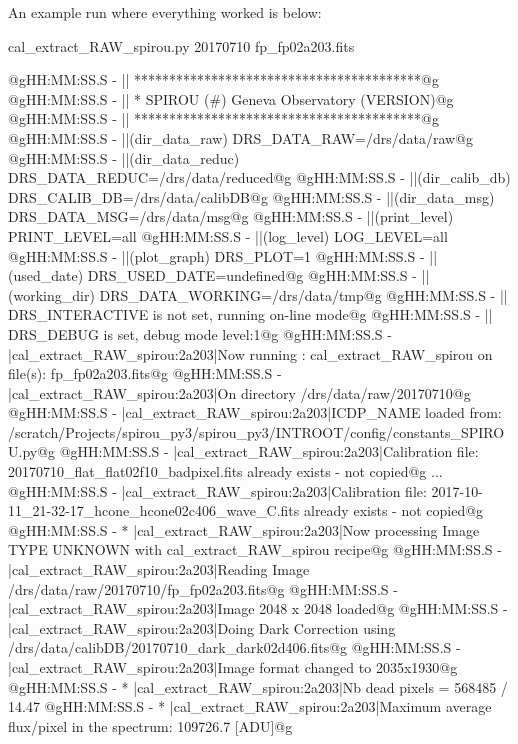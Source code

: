 An example run where everything worked is below:
\begin{cmdbox}[title={example}]
cal_extract_RAW_spirou.py 20170710 fp_fp02a203.fits
\end{cmdbox}
\begin{cmdboxprintspecial}[fontupper=\tiny, fontlower=\tiny]
@gHH:MM:SS.S -   || *****************************************@g
@gHH:MM:SS.S -   || * SPIROU \@(#) Geneva Observatory (VERSION)@g
@gHH:MM:SS.S -   || *****************************************@g
@gHH:MM:SS.S -   ||(dir_data_raw)      DRS_DATA_RAW=/drs/data/raw@g
@gHH:MM:SS.S -   ||(dir_data_reduc)    DRS_DATA_REDUC=/drs/data/reduced@g
@gHH:MM:SS.S -   ||(dir_calib_db)      DRS_CALIB_DB=/drs/data/calibDB@g
@gHH:MM:SS.S -   ||(dir_data_msg)      DRS_DATA_MSG=/drs/data/msg@g
@gHH:MM:SS.S -   ||(print_level)       PRINT_LEVEL=all         %
@gHH:MM:SS.S -   ||(log_level)         LOG_LEVEL=all         %
@gHH:MM:SS.S -   ||(plot_graph)        DRS_PLOT=1            %
@gHH:MM:SS.S -   ||(used_date)         DRS_USED_DATE=undefined@g
@gHH:MM:SS.S -   ||(working_dir)       DRS_DATA_WORKING=/drs/data/tmp@g
@gHH:MM:SS.S -   ||                    DRS_INTERACTIVE is not set, running on-line mode@g
@gHH:MM:SS.S -   ||                    DRS_DEBUG is set, debug mode level:1@g
@gHH:MM:SS.S -   |cal_extract_RAW_spirou:2a203|Now running : cal_extract_RAW_spirou on file(s): fp_fp02a203.fits@g
@gHH:MM:SS.S -   |cal_extract_RAW_spirou:2a203|On directory /drs/data/raw/20170710@g
@gHH:MM:SS.S -   |cal_extract_RAW_spirou:2a203|ICDP_NAME loaded from: /scratch/Projects/spirou_py3/spirou_py3/INTROOT/config/constants_SPIROU.py@g
@gHH:MM:SS.S -   |cal_extract_RAW_spirou:2a203|Calibration file: 20170710_flat_flat02f10_badpixel.fits already exists - not copied@g
...
@gHH:MM:SS.S -   |cal_extract_RAW_spirou:2a203|Calibration file: 2017-10-11_21-32-17_hcone_hcone02c406_wave_C.fits already exists - not copied@g
@gHH:MM:SS.S - * |cal_extract_RAW_spirou:2a203|Now processing Image TYPE UNKNOWN with cal_extract_RAW_spirou recipe@g
@gHH:MM:SS.S -   |cal_extract_RAW_spirou:2a203|Reading Image /drs/data/raw/20170710/fp_fp02a203.fits@g
@gHH:MM:SS.S -   |cal_extract_RAW_spirou:2a203|Image 2048 x 2048 loaded@g
@gHH:MM:SS.S -   |cal_extract_RAW_spirou:2a203|Doing Dark Correction using /drs/data/calibDB/20170710_dark_dark02d406.fits@g
@gHH:MM:SS.S -   |cal_extract_RAW_spirou:2a203|Image format changed to 2035x1930@g
@gHH:MM:SS.S - * |cal_extract_RAW_spirou:2a203|Nb dead pixels = 568485 / 14.47 %
@gHH:MM:SS.S - * |cal_extract_RAW_spirou:2a203|Maximum average flux/pixel in the spectrum: 109726.7 [ADU]@g

\end{cmdboxprintspecial}
